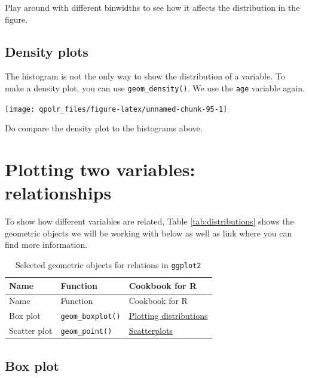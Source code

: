 \documentclass[12pt,oneside]{reedthesis}
\theoremstyle{definition}
\theoremstyle{definition}
\theoremstyle{definition}
\theoremstyle{remark}
\begin{document}
  Play around with different binwidths to see how it affects the
  distribution in the figure.
  
  \subsection{Density plots}\label{density-plots}
  
  The histogram is not the only way to show the distribution of a
  variable. To make a density plot, you can use \texttt{geom\_density()}.
  We use the \texttt{age} variable again.
  \begin{Shaded}
  \begin{Highlighting}[]
  \NormalTok{(}\OperatorTok{+}
  \StringTok{  }\NormalTok{() }
  \end{Highlighting}
  \end{Shaded}
  \begin{center}\texttt{[image: qpolr\_files/figure-latex/unnamed-chunk-95-1]} \end{center}
  
  Do compare the density plot to the histograms above.
  
  \section{Plotting two variables:
  relationships}\label{plotting-two-variables-relationships}
  
  To show how different variables are related, Table
  \ref{tab:distributions} shows the geometric objects we will be working
  with below as well as link where you can find more information.
  \begin{longtable}[]{@{}lll@{}}
  \caption{\label{tab:relationships} Selected geometric objects for relations
  in \texttt{ggplot2}}\tabularnewline
  \toprule
  Name & Function & Cookbook for R\tabularnewline
  \midrule
  \endfirsthead
  \toprule
  Name & Function & Cookbook for R\tabularnewline
  \midrule
  \endhead
  Box plot & \texttt{geom\_boxplot()} &
  \href{http://www.cookbook-r.com/Graphs/Plotting_distributions_(ggplot2)/}{Plotting
  distributions}\tabularnewline
  Scatter plot & \texttt{geom\_point()} &
  \href{http://www.cookbook-r.com/Graphs/Scatterplots_(ggplot2)/}{Scatterplots}\tabularnewline
  \bottomrule
  \end{longtable}
  \subsection{Box plot}\label{box-plot}
  
\end{document}
